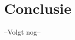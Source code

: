 \documentclass{article}
\begin{document}

\section{Conclusie}
--Volgt nog--
\pagebreak
\end{document}
